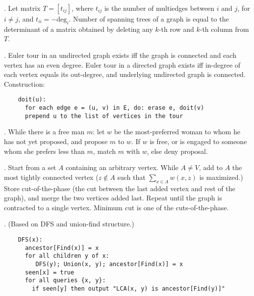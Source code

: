 .
Let matrix $T = [t_{ij}]$, where $t_{ij}$ is the number of multiedges
between $i$ and $j$, for $i \ne j$, and $t_{ii} = -\mbox{deg}_i$.
Number of spanning trees of a graph is equal to the determinant of
a matrix obtained by deleting any $k$-th row and $k$-th column from $T$.

.
Euler tour in an undirected graph exists iff the graph is connected and each
vertex has an even degree.  Euler tour in a directed graph exists iff in-degree
of each vertex equals its out-degree, and underlying undirected graph is connected.
Construction:
\vspace{-5mm}
\begin{verbatim}
    doit(u):
      for each edge e = (u, v) in E, do: erase e, doit(v)
      prepend u to the list of vertices in the tour
\end{verbatim}
\vspace{-2mm}

.
While there is a free man $m$: let $w$ be the most-preferred woman to whom he
has not yet proposed, and propose $m$ to $w$. If $w$ is free, or is engaged to someone whom
she prefers less than $m$, match $m$ with $w$, else deny proposal.

.
Start from a set $A$ containing an arbitrary vertex.
While $A \ne V$, add to $A$ the most tightly connected vertex
($z \notin A$ such that $\sum_{x \in A} w(x, z)$ is maximized.)
Store cut-of-the-phase (the cut between the last added vertex and rest of
the graph), and merge the two vertices added last.  Repeat until the graph
is contracted to a single vertex.  Minimum cut is one of the cuts-of-the-phase.

. (Based on DFS and union-find structure.)
\begin{verbatim}
    DFS(x):
      ancestor[Find(x)] = x
      for all children y of x:
         DFS(y); Union(x, y); ancestor[Find(x)] = x
      seen[x] = true
      for all queries {x, y}:
        if seen[y] then output "LCA(x, y) is ancestor[Find(y)]"
\end{verbatim}

